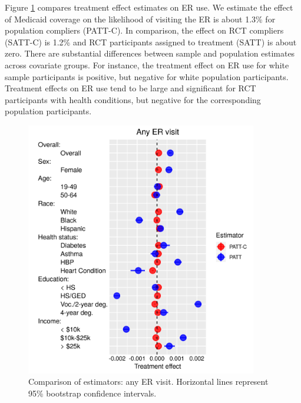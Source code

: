 \documentclass[hidelinks,12pt]{article}
\begin{document}
Figure \ref{fig:any-visit-plot} compares treatment effect estimates on ER use. We estimate the effect of Medicaid coverage on the likelihood of visiting the ER is about 1.3\% for population compliers (PATT-C). In comparison, the effect on RCT compliers (SATT-C) is 1.2\% and RCT participants assigned to treatment (SATT) is about zero. There are substantial differences between sample and population estimates across covariate groups. For instance, the treatment effect on ER use for white sample participants is positive, but negative for white population participants. Treatment effects on ER use tend to be large and significant for RCT participants with health conditions, but negative for the corresponding population participants.
%

\begin{figure}[htbp]
\begin{center}
\includegraphics[width = 0.9\textwidth]{any-visit-plot}
    \caption{Comparison of estimators: any ER visit. Horizontal lines represent 95\% bootstrap confidence intervals.\label{fig:any-visit-plot}}
\end{center}
\end{figure}
\end{document}

